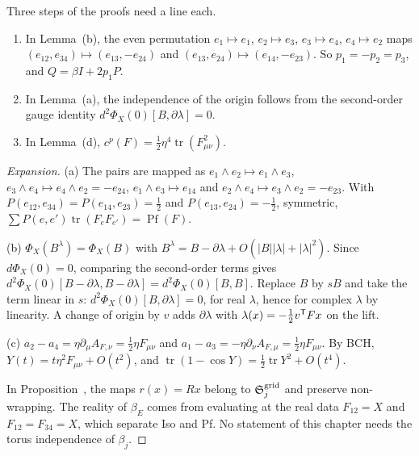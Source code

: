 \begin{detail}\label{xb:d-period}
Three steps of the proofs need a line each.
\begin{enumerate}[label=(\alph*)]
\item In Lemma~(b), the even permutation $e_1\mapsto e_1$, $e_2\mapsto e_3$, $e_3\mapsto e_4$, $e_4\mapsto e_2$ maps $(e_{12},e_{34})\mapsto(e_{13},-e_{24})$ and $(e_{13},e_{24})\mapsto(e_{14},-e_{23})$. So $p_1=-p_2=p_3$, and $Q=\beta I+2p_1P$.
\item In Lemma~(a), the independence of the origin follows from the second-order gauge identity $d^2\Phi_X(0)[B,\partial\lambda]=0$.
\item In Lemma~(d), $c^p(F)=\frac12\eta^4\operatorname{tr}(F_{\mu\nu}^2)$.
\end{enumerate}
\end{detail}

\begin{proof}[Expansion]
(a) The pairs are mapped as $e_1\wedge e_2\mapsto e_1\wedge e_3$, $e_3\wedge e_4\mapsto e_4\wedge e_2=-e_{24}$, $e_1\wedge e_3\mapsto e_{14}$ and $e_2\wedge e_4\mapsto e_3\wedge e_2=-e_{23}$. With $P(e_{12},e_{34})=P(e_{14},e_{23})=\frac12$ and $P(e_{13},e_{24})=-\frac12$, symmetric, $\sum P(e,e')\operatorname{tr}(F_eF_{e'})=\operatorname{Pf}(F)$.

(b) $\Phi_X(B^\lambda)=\Phi_X(B)$ with $B^\lambda=B-\partial\lambda+O(|B||\lambda|+|\lambda|^2)$. Since $d\Phi_X(0)=0$, comparing the second-order terms gives $d^2\Phi_X(0)[B-\partial\lambda,B-\partial\lambda]=d^2\Phi_X(0)[B,B]$. Replace $B$ by $sB$ and take the term linear in $s$: $d^2\Phi_X(0)[B,\partial\lambda]=0$, for real $\lambda$, hence for complex $\lambda$ by linearity. A change of origin by $v$ adds $\partial\lambda$ with $\lambda(x)=-\frac12v^{\sf T}Fx$ on the lift.

(c) $a_2-a_4=\eta\partial_\mu A_{F,\nu}=\frac12\eta F_{\mu\nu}$ and $a_1-a_3=-\eta\partial_\nu A_{F,\mu}=\frac12\eta F_{\mu\nu}$. By BCH, $Y(t)=t\eta^2F_{\mu\nu}+O(t^2)$, and $\operatorname{tr}(1-\cos Y)=\frac12\operatorname{tr}Y^2+O(t^4)$.

In Proposition~, the maps $r(x)=Rx$ belong to $\mathfrak S^{\rm grid}_j$ and preserve non-wrapping. The reality of $\beta_E$ comes from evaluating at the real data $F_{12}=X$ and $F_{12}=F_{34}=X$, which separate Iso and Pf. No statement of this chapter needs the torus independence of $\beta_j$.
\end{proof}

